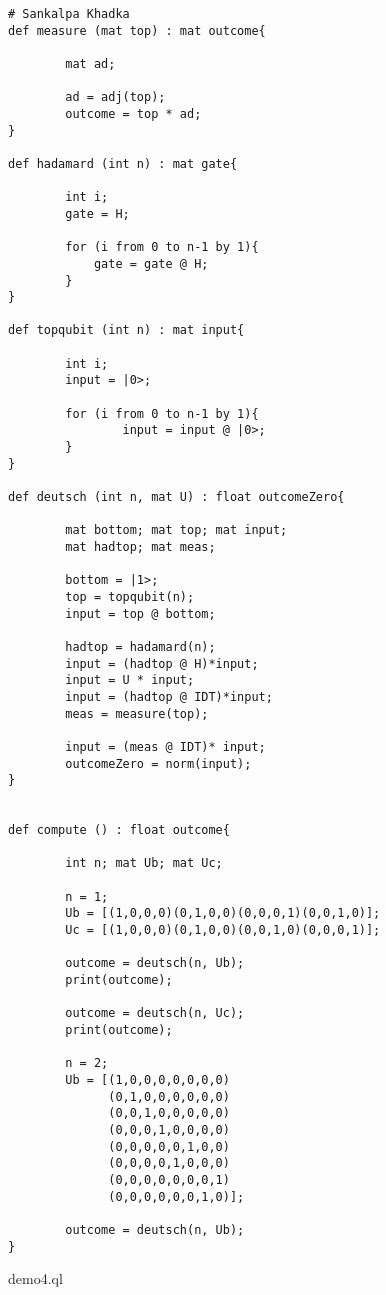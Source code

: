 \begin{lstlisting}
# Sankalpa Khadka
def measure (mat top) : mat outcome{
        
        mat ad;

        ad = adj(top);
        outcome = top * ad;
}

def hadamard (int n) : mat gate{
        
        int i;
        gate = H;

        for (i from 0 to n-1 by 1){
            gate = gate @ H; 
        }
}

def topqubit (int n) : mat input{

        int i;
        input = |0>;

        for (i from 0 to n-1 by 1){
                input = input @ |0>;
        }          
}

def deutsch (int n, mat U) : float outcomeZero{

        mat bottom; mat top; mat input;
        mat hadtop; mat meas;

        bottom = |1>;
        top = topqubit(n);
        input = top @ bottom;
        
        hadtop = hadamard(n);
        input = (hadtop @ H)*input;
        input = U * input;
        input = (hadtop @ IDT)*input;
        meas = measure(top);

        input = (meas @ IDT)* input;
        outcomeZero = norm(input);
}


def compute () : float outcome{

        int n; mat Ub; mat Uc;

        n = 1;
        Ub = [(1,0,0,0)(0,1,0,0)(0,0,0,1)(0,0,1,0)];
        Uc = [(1,0,0,0)(0,1,0,0)(0,0,1,0)(0,0,0,1)];

        outcome = deutsch(n, Ub);
        print(outcome);
        
        outcome = deutsch(n, Uc);
        print(outcome);

        n = 2;
        Ub = [(1,0,0,0,0,0,0,0) 
              (0,1,0,0,0,0,0,0)
              (0,0,1,0,0,0,0,0)
              (0,0,0,1,0,0,0,0) 
              (0,0,0,0,0,1,0,0) 
              (0,0,0,0,1,0,0,0)
              (0,0,0,0,0,0,0,1)
              (0,0,0,0,0,0,1,0)];

        outcome = deutsch(n, Ub);
}

\end{lstlisting}
demo4.ql
